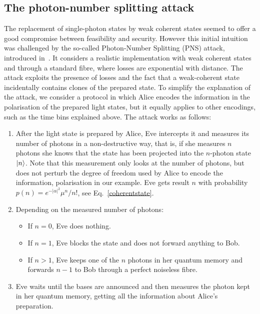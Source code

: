 \documentclass[a4paper]{article}
\begin{document}
\subsection{The photon-number splitting attack}

The replacement of single-photon states by weak coherent states seemed to offer a good compromise between feasibility and security. However this initial intuition was challenged by the so-called Photon-Number Splitting (PNS) attack, introduced in~\cite{PNS}. It considers a realistic implementation with weak coherent states and through a standard fibre, where losses are exponential with distance. The attack exploits the presence of losses and the fact that a weak-coherent state incidentally contains clones of the prepared state. To simplify the explanation of the attack, we consider a protocol in which Alice encodes the information in the polarisation of the prepared light states, but it equally applies to other encodings, such as the time bins explained above. The attack works as follows:
\begin{enumerate}
\item After the light state is prepared by Alice, Eve intercepts it and measures its number of photons in a non-destructive way, that is, if she measures $n$ photons she knows that the state has been projected into the $n$-photon state $|n\rangle$. Note that this measurement only looks at the number of photons, but does not perturb the degree of freedom used by Alice to encode the information, polarisation in our example. Eve gets result $n$ with probability $p(n)=e^{-|\alpha|^2} \mu^n/n!$, see Eq.~\eqref{coherentstate}.
\item Depending on the measured number of photons:
\begin{itemize}
\item If $n=0$, Eve does nothing.
\item If $n=1$, Eve blocks the state and does not forward anything to Bob.
\item If $n>1$, Eve keeps one of the $n$ photons in her quantum memory and forwards $n-1$ to Bob through a perfect noiseless fibre. 
\end{itemize}
\item Eve waits until the bases are announced and then measures the photon kept in her quantum memory, getting all the information about Alice's preparation.
\end{enumerate}
\end{document}
